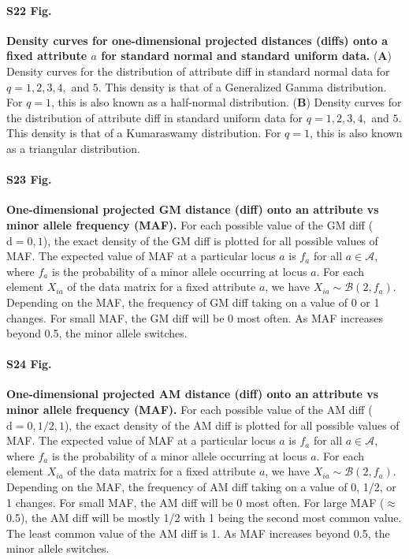 \documentclass[10pt,letterpaper]{article}
\begin{document}
\paragraph*{S22 Fig.}
\hypertarget{S22_Fig}{
{\bf Density curves for one-dimensional projected distances (diffs) onto a fixed attribute $a$ for standard normal and standard uniform data.} (\textbf{A}) Density curves for the distribution of attribute diff in standard normal data for $q=1,2,3,4,$ and $5$. This density is that of a Generalized Gamma distribution. For $q=1$, this is also known as a half-normal distribution. (\textbf{B}) Density curves for the distribution of attribute diff in standard uniform data for $q=1,2,3,4,$ and $5$. This density is that of a Kumaraswamy distribution. For $q=1$, this is also known as a triangular distribution.}

\paragraph*{S23 Fig.}
\hypertarget{S23_Fig}{
{\bf One-dimensional projected GM distance (diff) onto an attribute vs minor allele frequency (MAF).} For each possible value of the GM diff ($\text{d} = 0,1$), the exact density of the GM diff is plotted for all possible values of MAF. The expected value of MAF at a particular locus $a$ is $f_a$ for all $a \in \mathcal{A}$, where $f_a$ is the probability of a minor allele occurring at locus $a$. For each element $X_{ia}$ of the data matrix for a fixed attribute $a$, we have $X_{ia} \sim \mathcal{B}(2,f_a)$. Depending on the MAF, the frequency of GM diff taking on a value of 0 or 1 changes. For small MAF, the GM diff will be 0 most often. As MAF increases beyond 0.5, the minor allele switches.}

\paragraph*{S24 Fig.}
\hypertarget{S24_Fig}{
{\bf One-dimensional projected AM distance (diff) onto an attribute vs minor allele frequency (MAF).} For each possible value of the AM diff ($\text{d} = 0,1/2,1$), the exact density of the AM diff is plotted for all possible values of MAF. The expected value of MAF at a particular locus $a$ is $f_a$ for all $a \in \mathcal{A}$, where $f_a$ is the probability of a minor allele occurring at locus $a$. For each element $X_{ia}$ of the data matrix for a fixed attribute $a$, we have $X_{ia} \sim \mathcal{B}(2,f_a)$. Depending on the MAF, the frequency of AM diff taking on a value of 0, 1/2, or 1 changes. For small MAF, the AM diff will be 0 most often. For large MAF ($\approx$0.5), the AM diff will be mostly 1/2 with 1 being the second most common value. The least common value of the AM diff is 1. As MAF increases beyond 0.5, the minor allele switches.}
\end{document}
